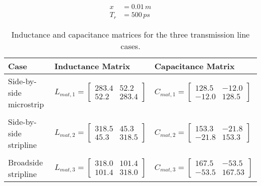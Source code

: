 \documentclass[../main.tex]{subfiles}
\begin{document}
\begin{align*}
    x &= 0.01\,\si{m} \\
    T_r &= 500\,\si{ps}
\end{align*}

\newpage

\begin{table}[t]
    \centering
    \begin{tabular}{l|l l}
        \toprule[1pt]
        \textbf{Case} & \textbf{Inductance Matrix} & \textbf{Capacitance Matrix} \\
        \midrule
        Side-by-side microstrip &
        $L_{mat,1} =
        \begin{bmatrix}
            283.4 & 52.2 \\
            52.2 & 283.4
        \end{bmatrix}$ &
        $C_{mat,1} =
        \begin{bmatrix}
            128.5 & -12.0 \\
            -12.0 & 128.5
        \end{bmatrix}$ \\
        && \\
        Side-by-side stripline &
        $L_{mat,2} =
        \begin{bmatrix}
            318.5 & 45.3 \\
            45.3 & 318.5
        \end{bmatrix}$ &
        $C_{mat,2} =
        \begin{bmatrix}
            153.3 & -21.8 \\
            -21.8 & 153.3
        \end{bmatrix}$ \\
        && \\
        Broadside stripline &
        $L_{mat,3} =
        \begin{bmatrix}
            318.0 & 101.4 \\
            101.4 & 318.0
        \end{bmatrix}$ &
        $C_{mat,3} =
        \begin{bmatrix}
            167.5 & -53.5 \\
            -53.5 &167.53
        \end{bmatrix}$ \\
        \bottomrule[1pt]
    \end{tabular}
    \caption{Inductance and capacitance matrices for the three transmission line cases.}
    \label{tab:lc-matrix}
\end{table}
\end{document}

